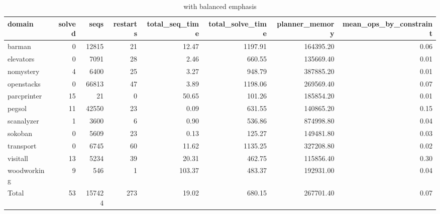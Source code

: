 \begin{table*}[htbp]
\centering
\begingroup\small
\begin{tabular}{lrrrrrrr}
  \hline
domain & solved & seqs & restarts & total\_seq\_time & total\_solve\_time & planner\_memory & mean\_ops\_by\_constraint \\ 
  \hline
barman &   0 & 12815 &  21 & 12.47 & 1197.91 & 164395.20 & 0.06 \\ 
  elevators &   0 & 7091 &  28 & 2.46 & 660.55 & 135669.40 & 0.01 \\ 
  nomystery &   4 & 6400 &  25 & 3.27 & 948.79 & 387885.20 & 0.01 \\ 
  openstacks &   0 & 66813 &  47 & 3.89 & 1198.06 & 269569.40 & 0.07 \\ 
  parcprinter &  15 &  21 &   0 & 50.65 & 101.26 & 185854.20 & 0.01 \\ 
  pegsol &  11 & 42550 &  23 & 0.09 & 631.55 & 140865.20 & 0.15 \\ 
  scanalyzer &   1 & 3600 &   6 & 0.90 & 536.86 & 874998.80 & 0.04 \\ 
  sokoban &   0 & 5609 &  23 & 0.13 & 125.27 & 149481.80 & 0.03 \\ 
  transport &   0 & 6745 &  60 & 11.62 & 1135.25 & 327208.80 & 0.02 \\ 
  visitall &  13 & 5234 &  39 & 20.31 & 462.75 & 115856.40 & 0.30 \\ 
  woodworking &   9 & 546 &   1 & 103.37 & 483.37 & 192931.00 & 0.04 \\ 
  Total &  53 & 157424 & 273 & 19.02 & 680.15 & 267701.40 & 0.07 \\ 
   \hline
\end{tabular}
\endgroup
\caption{\oursolver{} with balanced emphasis} 
\label{tab:default_our}
\end{table*}
